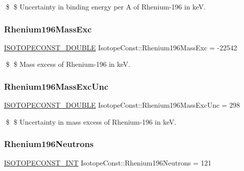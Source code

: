 \$ \$ Uncertainty in binding energy per A of Rhenium-\/196 in keV. \mbox{\label{group___isotope_const-_rhenium-_re196_ga4dc6d123f5ad3129cd49001808fe42a8}} 
\subsubsection{\texorpdfstring{Rhenium196\+Mass\+Exc}{Rhenium196MassExc}}
{\footnotesize\ttfamily \mbox{\hyperlink{group___isotope_const-_macros_ga8f45a7272ce02c0b4c65c44636ed719a}{I\+S\+O\+T\+O\+P\+E\+C\+O\+N\+S\+T\+\_\+\+D\+O\+U\+B\+LE}} Isotope\+Const\+::\+Rhenium196\+Mass\+Exc = -\/22542}

\$ \$ Mass excess of Rhenium-\/196 in keV. \mbox{\label{group___isotope_const-_rhenium-_re196_gab9aa508ccb7fe2c43fda1916d924012a}} 
\subsubsection{\texorpdfstring{Rhenium196\+Mass\+Exc\+Unc}{Rhenium196MassExcUnc}}
{\footnotesize\ttfamily \mbox{\hyperlink{group___isotope_const-_macros_ga8f45a7272ce02c0b4c65c44636ed719a}{I\+S\+O\+T\+O\+P\+E\+C\+O\+N\+S\+T\+\_\+\+D\+O\+U\+B\+LE}} Isotope\+Const\+::\+Rhenium196\+Mass\+Exc\+Unc = 298}

\$ \$ Uncertainty in mass excess of Rhenium-\/196 in keV. \mbox{\label{group___isotope_const-_rhenium-_re196_ga1704834322d4c07117245a48f00a1d4f}} 
\subsubsection{\texorpdfstring{Rhenium196\+Neutrons}{Rhenium196Neutrons}}
{\footnotesize\ttfamily \mbox{\hyperlink{group___isotope_const-_macros_ga5f18360b3e99483a35c32d789e62621c}{I\+S\+O\+T\+O\+P\+E\+C\+O\+N\+S\+T\+\_\+\+I\+NT}} Isotope\+Const\+::\+Rhenium196\+Neutrons = 121}


